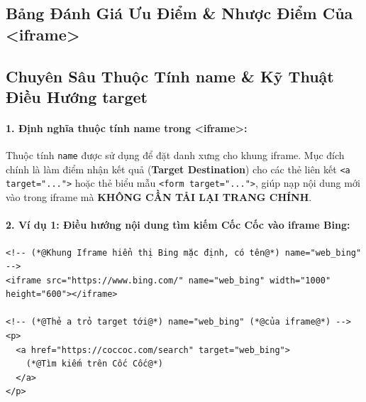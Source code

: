 \documentclass[11pt,oneside]{book}
\newcommand{\thd}[1]{\textcolor{white}{\textbf{\strut #1}}}
\newcommand{\codeinline}[1]{\textcolor{accentOrange}{\texttt{#1}}}
\newcommand{\term}[1]{\textbf{\textcolor{primaryBlue}{#1}}}
\begin{document}
\subsection{Bảng Đánh Giá Ưu Điểm \& Nhược Điểm Của <iframe>}

\begin{prettyTableBox}
\end{prettyTableBox}

\subsection{Chuyên Sâu Thuộc Tính name \& Kỹ Thuật Điều Hướng target}

\paragraph{1. Định nghĩa thuộc tính name trong <iframe>:}
Thuộc tính \codeinline{name} được sử dụng để đặt danh xưng cho khung iframe. Mục đích chính là làm điểm nhận kết quả (\term{Target Destination}) cho các thẻ liên kết \codeinline{<a target="...">} hoặc thẻ biểu mẫu \codeinline{<form target="...">}, giúp nạp nội dung mới vào trong iframe mà \textbf{KHÔNG CẦN TẢI LẠI TRANG CHÍNH}.

\paragraph{2. Ví dụ 1: Điều hướng nội dung tìm kiếm Cốc Cốc vào iframe Bing:}
\begin{codeWindow}
\begin{lstlisting}[language=HTML5]
<!-- (*@Khung Iframe hiển thị Bing mặc định, có tên@*) name="web_bing" -->
<iframe src="https://www.bing.com/" name="web_bing" width="1000" height="600"></iframe>

<!-- (*@Thẻ a trỏ target tới@*) name="web_bing" (*@của iframe@*) -->
<p>
  <a href="https://coccoc.com/search" target="web_bing">
    (*@Tìm kiếm trên Cốc Cốc@*)
  </a>
</p>
\end{lstlisting}
\end{codeWindow}
\end{document}
